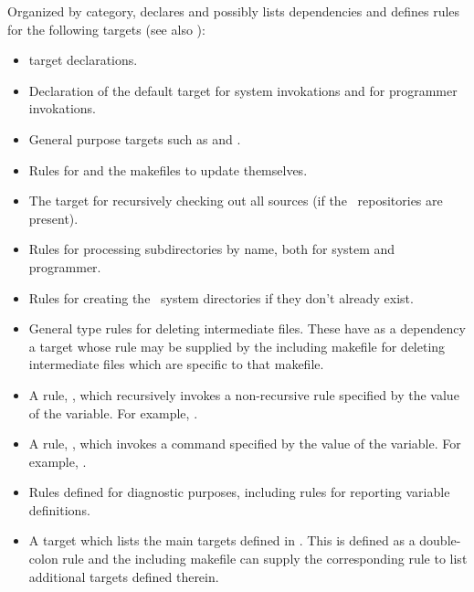 Organized by category,  declares and possibly lists
dependencies and defines rules for the following targets (see also
):

\begin{itemize}
\item
    target declarations.

\item
   Declaration of the default target  for system invokations and
    for programmer invokations.

\item
   General purpose targets such as  and .

\item
   Rules for  and the makefiles to update themselves.

\item
   The  target for recursively checking out all sources (if the
   \rcs\ repositories are present).

\item
   Rules for processing subdirectories by name, both for system and
   programmer.

\item
   Rules for creating the \aipspp\ system directories if they don't already
   exist.

\item
   General  type rules for deleting intermediate files.  These
   have as a dependency a target whose rule may be supplied by the including
   makefile for deleting intermediate files which are specific to that
   makefile.

\item
   A rule, , which recursively invokes a non-recursive rule
   specified by the value of the  variable.  For example,
   .

\item
   A rule, , which invokes a command specified by the value of
   the  variable.  For example,
   .

\item
   Rules defined for diagnostic purposes, including rules for reporting
   variable definitions.

\item
   A  target which lists the main targets defined in
   .  This is defined as a double-colon rule and the including
   makefile can supply the corresponding rule to list additional targets
   defined therein.
\end{itemize}

